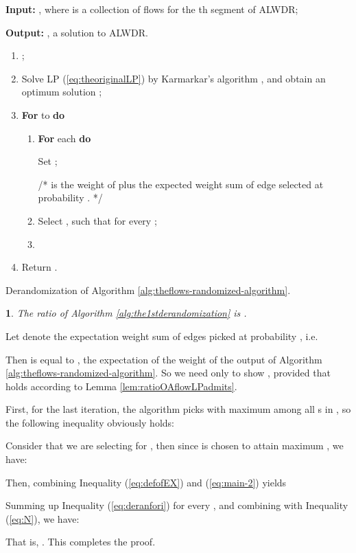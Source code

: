 \documentclass[11pt,english,onecolumn,draftcls]{IEEEtran}
\theoremstyle{plain}
\theoremstyle{plain}
\theoremstyle{plain}
\newtheorem{lem}[thm]{\protect\lemmaname}
\theoremstyle{plain}
\providecommand{\lemmaname}{Lemma}
\begin{document}
\begin{algorithm}
\textbf{Input: },
where  is a collection of flows for
the th segment of ALWDR;

\textbf{Output:} , a solution to ALWDR.
\begin{enumerate}
\item ;
\item Solve LP (\ref{eq:theoriginalLP}) by Karmarkar's algorithm \cite{schrijver1998theory},
and obtain an optimum solution ;
\item \textbf{For}  to  \textbf{do }

\begin{enumerate}
\item \textbf{For} each  \textbf{do}


\quad{}Set ;


\quad{}/{*}  is the weight of  plus the expected
weight sum of edge  selected at probability
. {*}/

\item Select , such that  for
every ;
\item 
\end{enumerate}
\item Return .
\end{enumerate}
\protect\caption{\label{alg:the1stderandomization}Derandomization of Algorithm \ref{alg:theflows-randomized-algorithm}.}
\end{algorithm}

\begin{lem}
The ratio of Algorithm \ref{alg:the1stderandomization} is .\end{lem}
\begin{IEEEproof}
Let  denote the expectation weight sum of
edges  picked at probability , i.e.




Then  is equal to , the expectation
of the weight of the output of Algorithm \ref{alg:theflows-randomized-algorithm}.
So we need only to show ,
provided that  holds according
to Lemma \ref{lem:ratioOAflowLPadmits}.

First, for the last iteration, the algorithm picks 
with maximum  among all s in , so
the following inequality obviously holds:




Consider that we are selecting for , then since  is
chosen to attain maximum , we have:




Then, combining Inequality (\ref{eq:defofEX}) and (\ref{eq:main-2})
yields




Summing up Inequality (\ref{eq:deranfori}) for every ,
and combining with Inequality (\ref{eq:N}), we have:




That is, .
This completes the proof.
\end{IEEEproof}
\end{document}

